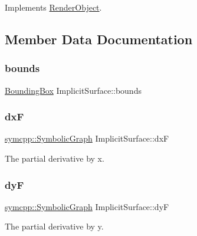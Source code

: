 Implements \mbox{\hyperlink{classRenderObject_aa844ad2c5ef0c2b79faef2ed0af553bb}{Render\+Object}}.



\subsection{Member Data Documentation}
\mbox{\label{classImplicitSurface_a1332a4975d57ce5f91450221541df82a}} 
\subsubsection{\texorpdfstring{bounds}{bounds}}
{\footnotesize\ttfamily \mbox{\hyperlink{classBoundingBox}{Bounding\+Box}} Implicit\+Surface\+::bounds\hspace{0.3cm}{\ttfamily [private]}}

\mbox{\label{classImplicitSurface_a9861b92609a363bf78d73347a9272b5d}} 
\subsubsection{\texorpdfstring{dxF}{dxF}}
{\footnotesize\ttfamily \mbox{\hyperlink{classsymcpp_1_1SymbolicGraph}{symcpp\+::\+Symbolic\+Graph}} Implicit\+Surface\+::dxF\hspace{0.3cm}{\ttfamily [private]}}



The partial derivative by x. 

\mbox{\label{classImplicitSurface_a49145c0375f0adc02157b9368e733aa2}} 
\subsubsection{\texorpdfstring{dyF}{dyF}}
{\footnotesize\ttfamily \mbox{\hyperlink{classsymcpp_1_1SymbolicGraph}{symcpp\+::\+Symbolic\+Graph}} Implicit\+Surface\+::dyF\hspace{0.3cm}{\ttfamily [private]}}



The partial derivative by y. 

